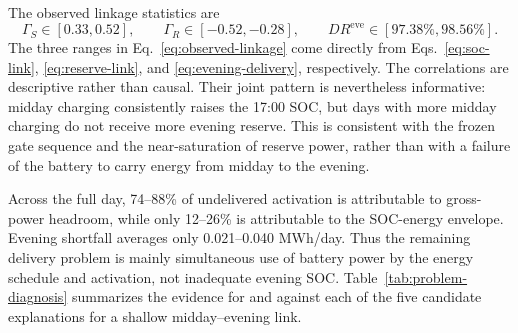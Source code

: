 \documentclass[11pt,a4paper]{article}
\begin{document}
The observed linkage statistics are
\begin{equation}
  \Gamma_S\in[0.33,0.52],
  \qquad
  \Gamma_R\in[-0.52,-0.28],
  \qquad
  DR^{\mathrm{eve}}\in[97.38\%,98.56\%].
  \label{eq:observed-linkage}
\end{equation}
The three ranges in Eq.~\eqref{eq:observed-linkage} come directly from
Eqs.~\eqref{eq:soc-link}, \eqref{eq:reserve-link}, and
\eqref{eq:evening-delivery}, respectively.
The correlations are descriptive rather than causal.  Their joint pattern is
nevertheless informative: midday charging consistently raises the 17:00 SOC,
but days with more midday charging do not receive more evening reserve.  This
is consistent with the frozen gate sequence and the near-saturation of reserve
power, rather than with a failure of the battery to carry energy from midday to
the evening.

Across the full day, 74--88\% of undelivered activation is attributable to
gross-power headroom, while only 12--26\% is attributable to the SOC-energy
envelope.  Evening shortfall averages only 0.021--0.040 MWh/day.  Thus the
remaining delivery problem is mainly simultaneous use of battery power by the
energy schedule and activation, not inadequate evening SOC.
Table~\ref{tab:problem-diagnosis} summarizes the evidence for and against each
of the five candidate explanations for a shallow midday--evening link.
\end{document}
